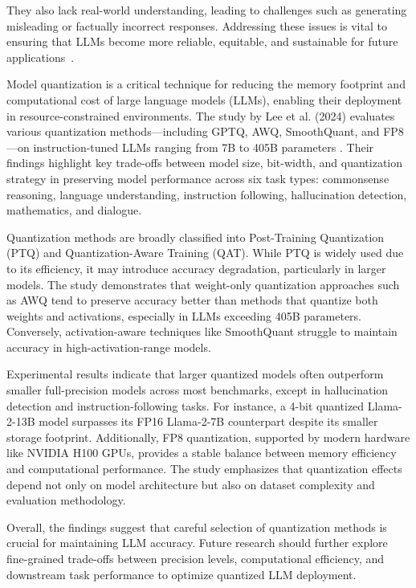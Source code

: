 They also lack real-world understanding, leading to challenges such as generating misleading or factually incorrect responses. Addressing these issues is vital to ensuring that LLMs become more reliable, equitable, and sustainable for future applications~\cite{limitations_llms}.

Model quantization is a critical technique for reducing the memory footprint and computational cost of large language models (LLMs), enabling their deployment in resource-constrained environments. The study by Lee et al. (2024) evaluates various quantization methods—including GPTQ, AWQ, SmoothQuant, and FP8—on instruction-tuned LLMs ranging from 7B to 405B parameters \cite{lee2024}. Their findings highlight key trade-offs between model size, bit-width, and quantization strategy in preserving model performance across six task types: commonsense reasoning, language understanding, instruction following, hallucination detection, mathematics, and dialogue.

Quantization methods are broadly classified into Post-Training Quantization (PTQ) and Quantization-Aware Training (QAT). While PTQ is widely used due to its efficiency, it may introduce accuracy degradation, particularly in larger models. The study demonstrates that weight-only quantization approaches such as AWQ tend to preserve accuracy better than methods that quantize both weights and activations, especially in LLMs exceeding 405B parameters. Conversely, activation-aware techniques like SmoothQuant struggle to maintain accuracy in high-activation-range models.

Experimental results indicate that larger quantized models often outperform smaller full-precision models across most benchmarks, except in hallucination detection and instruction-following tasks. For instance, a 4-bit quantized Llama-2-13B model surpasses its FP16 Llama-2-7B counterpart despite its smaller storage footprint. Additionally, FP8 quantization, supported by modern hardware like NVIDIA H100 GPUs, provides a stable balance between memory efficiency and computational performance. The study emphasizes that quantization effects depend not only on model architecture but also on dataset complexity and evaluation methodology.

Overall, the findings suggest that careful selection of quantization methods is crucial for maintaining LLM accuracy. Future research should further explore fine-grained trade-offs between precision levels, computational efficiency, and downstream task performance to optimize quantized LLM deployment.

